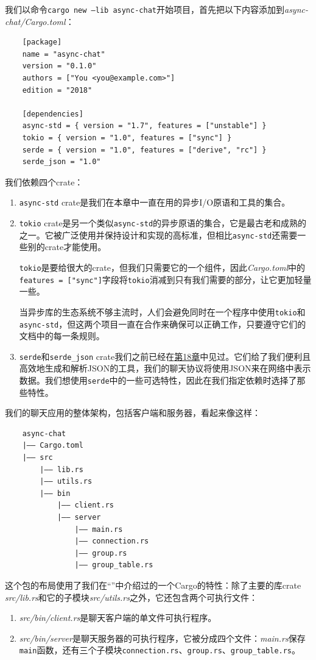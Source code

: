 我们以命令\texttt{cargo new --lib async-chat}开始项目，首先把以下内容添加到\emph{async-chat/Cargo.toml}：
\begin{verbatim}
    [package]
    name = "async-chat"
    version = "0.1.0"
    authors = ["You <you@example.com>"]
    edition = "2018"

    [dependencies]
    async-std = { version = "1.7", features = ["unstable"] }
    tokio = { version = "1.0", features = ["sync"] }
    serde = { version = "1.0", features = ["derive", "rc"] }
    serde_json = "1.0"
\end{verbatim}

我们依赖四个crate：
\begin{enumerate}
    \item \texttt{async-std} crate是我们在本章中一直在用的异步I/O原语和工具的集合。
    \item \texttt{tokio} crate是另一个类似\texttt{async-std}的异步原语的集合，它是最古老和成熟的之一。它被广泛使用并保持设计和实现的高标准，但相比\texttt{async-std}还需要一些别的crate才能使用。
    
    \texttt{tokio}是要给很大的crate，但我们只需要它的一个组件，因此\emph{Cargo.toml}中的\texttt{features = ["sync"]}字段将\texttt{tokio}消减到只有我们需要的部分，让它更加轻量一些。

    当异步库的生态系统不够主流时，人们会避免同时在一个程序中使用\texttt{tokio}和\texttt{async-std}，但这两个项目一直在合作来确保可以正确工作，只要遵守它们的文档中的每一条规则。
    \item \texttt{serde}和\texttt{serde\_json} crate我们之前已经在\hyperref[ch18]{第18章}中见过。它们给了我们便利且高效地生成和解析JSON的工具，我们的聊天协议将使用JSON来在网络中表示数据。我们想使用\texttt{serde}中的一些可选特性，因此在我们指定依赖时选择了那些特性。
\end{enumerate}

我们的聊天应用的整体架构，包括客户端和服务器，看起来像这样：
\begin{verbatim}
    async-chat
    |—— Cargo.toml
    |—— src
        |—— lib.rs
        |—— utils.rs
        |—— bin
            |—— client.rs
            |—— server
                |—— main.rs
                |—— connection.rs
                |—— group.rs
                |—— group_table.rs
\end{verbatim}

这个包的布局使用了我们在“”中介绍过的一个Cargo的特性：除了主要的库crate \emph{src/lib.rs}和它的子模块\emph{src/utils.rs}之外，它还包含两个可执行文件：
\begin{enumerate}
    \item \emph{src/bin/client.rs}是聊天客户端的单文件可执行程序。
    \item \emph{src/bin/server}是聊天服务器的可执行程序，它被分成四个文件：\emph{main.rs}保存\texttt{main}函数，还有三个子模块\texttt{connection.rs}、\texttt{group.rs}、\texttt{group\_table.rs}。
\end{enumerate}

